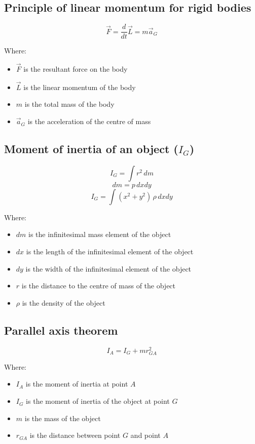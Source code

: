 \documentclass[11pt]{article}
\begin{document}
\subsection{Principle of linear momentum for rigid bodies}
\label{sec:org69abe89}
\[\vec{F} = \frac{d}{dt} \vec{L} = m \vec{a}_G\]

Where:
\begin{itemize}
\item \(\vec{F}\) is the resultant force on the body
\item \(\vec{L}\) is the linear momentum of the body
\item \(m\) is the total mass of the body
\item \(\vec{a}_G\) is the acceleration of the centre of mass
\end{itemize}

\subsection{Moment of inertia of an object (\(I_G\))}
\label{sec:org9da3b90}
\[I_G = \int r^2 \, dm\]
\[dm = p \, dx dy\]
\[I_G = \int (x^2 + y^2) \, \rho \, dx dy\]

Where:
\begin{itemize}
\item \(dm\) is the infinitesimal mass element of the object
\item \(dx\) is the length of the infinitesimal element of the object
\item \(dy\) is the width of the infinitesimal element of the object
\item \(r\) is the distance to the centre of mass of the object
\item \(\rho\) is the density of the object
\end{itemize}

\subsection{Parallel axis theorem}
\label{sec:org1db8908}
\[I_A = I_G + mr_{GA}^2\]

Where:
\begin{itemize}
\item \(I_A\) is the moment of inertia at point \(A\)
\item \(I_G\) is the moment of inertia of the object at point \(G\)
\item \(m\) is the mass of the object
\item \(r_{GA}\) is the distance between point \(G\) and point \(A\)
\end{itemize}
\end{document}
